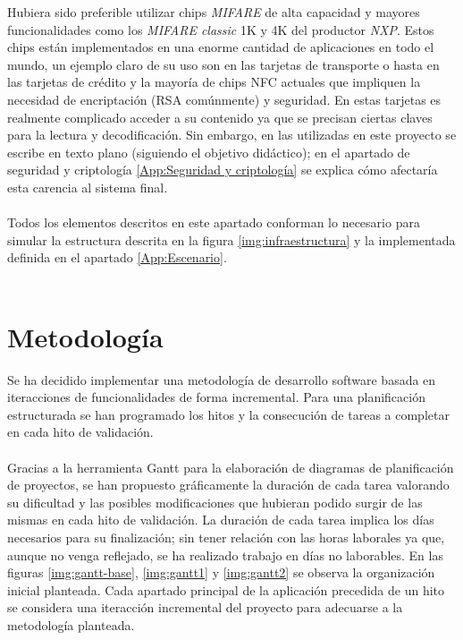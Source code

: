 \documentclass[../PFC.tex]{subfiles}
\begin{document}
Hubiera sido preferible utilizar chips \textit{MIFARE}\cite{mifare} de alta capacidad y mayores funcionalidades como los \textit{MIFARE classic} 1K y 4K del productor \textit{NXP}. Estos chips están implementados en una enorme cantidad de aplicaciones en todo el mundo, un ejemplo claro de su uso son en las tarjetas de transporte o hasta en las tarjetas de crédito y la mayoría de chips NFC actuales que impliquen la necesidad de encriptación (RSA comúnmente) y seguridad. En estas tarjetas es realmente complicado acceder a su contenido ya que se precisan ciertas claves para la lectura y decodificación. Sin embargo, en las utilizadas en este proyecto se escribe en texto plano (siguiendo el objetivo didáctico); en el apartado de seguridad y criptología \ref{App:Seguridad y criptología} se explica cómo afectaría esta carencia al sistema final. 
\\\\
Todos los elementos descritos en este apartado conforman lo necesario para simular la estructura descrita en la figura \ref{img:infraestructura} y la implementada definida en el apartado \ref{App:Escenario}. 
\\\\

\section{Metodología}
\label{App:Metodología}

Se ha decidido implementar una metodología de desarrollo software basada en iteracciones de funcionalidades de forma incremental. Para una planificación estructurada se han programado los hitos y la consecución de tareas a completar en cada hito de validación.
\\\\
Gracias a la herramienta Gantt\cite{gantt} para la elaboración de diagramas de planificación de proyectos, se han propuesto gráficamente la duración de cada tarea valorando su dificultad y las posibles modificaciones que hubieran podido surgir de las mismas en cada hito de validación. La duración de cada tarea implica los días necesarios para su finalización; sin tener relación con las horas laborales ya que, aunque no venga reflejado, se ha realizado trabajo en días no laborables. En las figuras \ref{img:gantt-base}, \ref{img:gantt1} y \ref{img:gantt2} se observa la organización inicial planteada. Cada apartado principal de la aplicación precedida de un hito se considera una iteracción incremental del proyecto para adecuarse a la metodología planteada.
\end{document}
